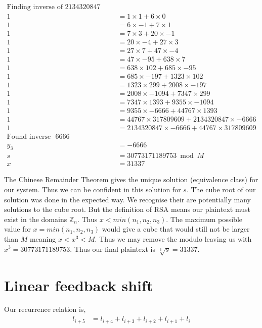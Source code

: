 \documentclass{article}
\begin{document}
\begin{align*}
    \text{Finding inverse of 2134320847 mod 44767} \\
    1 &= 1 \times 1 + 6 \times 0 \\
    1 &= 6 \times -1 + 7 \times 1 \\
    1 &= 7 \times 3 + 20 \times -1 \\
    1 &= 20 \times -4 + 27 \times 3 \\
    1 &= 27 \times 7 + 47 \times -4 \\
    1 &= 47 \times -95 + 638 \times 7 \\
    1 &= 638 \times 102 + 685 \times -95 \\
    1 &= 685 \times -197 + 1323 \times 102 \\
    1 &= 1323 \times 299 + 2008 \times -197 \\
    1 &= 2008 \times -1094 + 7347 \times 299 \\
    1 &= 7347 \times 1393 + 9355 \times -1094 \\
    1 &= 9355 \times -6666 + 44767 \times 1393 \\
    1 &= 44767 \times 317809609 + 2134320847 \times -6666 \\
    1 &= 2134320847 \times -6666 + 44767 \times 317809609 \\
    \text{Found inverse -6666} \\
    y_3 &= -6666 \\
    s &= 30773171189753 \bmod M \\
    x &= 31337
\end{align*}

The Chinese Remainder Theorem gives the unique solution (equivalence class)
for our system. Thus we can be confident in this solution for $s$.
The cube root of our solution was done in the expected way.
We recognise their are potentially many solutions to the cube root.
But the definition of RSA means our plaintext must exist in the domains
$\mathbb{Z}_n$. Thus $x < min(n_1, n_2, n_3)$. The maximum possible value for
$x = min(n_1, n_2, n_3)$ would give a cube that would still not be larger than
$M$ meaning $x < x^3 < M$. Thus we may remove the modulo leaving us with
$x^3 = 30773171189753$. Thus our final plaintext is $\sqrt[3]{s} = 31337$.

\section{Linear feedback shift}
Our recurrence relation is,
\begin{align*}
    l_{i+5} &= l_{i+4} + l_{i+3} + l_{i+2} + l_{i+1} + l_{i}
\end{align*}
\end{document}
